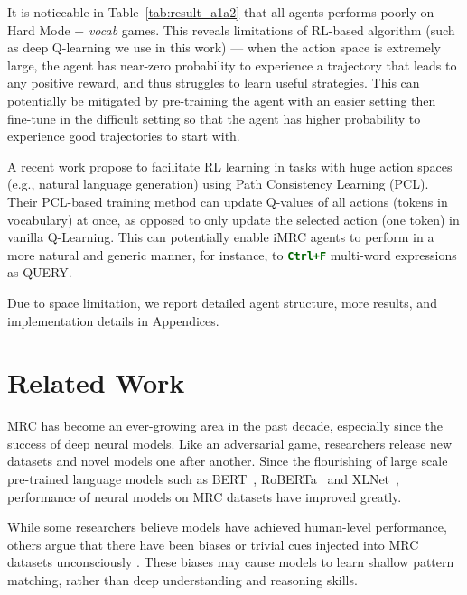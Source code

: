 \documentclass[11pt]{article}
\newcommand{\code}[1]{\texttt{#1}}
\newcommand{\cmd}[1]{\textcolor{darkgreen}{\textbf{\small{\code{#1}}}}}
\newcommand{\imrc}{iMRC\xspace}
\newcommand{\ctrlf}{Ctrl+F\xspace}
\newcommand{\query}{\textcolor{orange2}{\small{QUERY}}\xspace}
\begin{document}
It is noticeable in Table~\ref{tab:result_a1a2} that all agents performs poorly on Hard Mode + \textit{vocab} games.
This reveals limitations of RL-based algorithm (such as deep Q-learning we use in this work) --- when the action space is extremely large, the agent has near-zero probability to experience a trajectory that leads to any positive reward, and thus struggles to learn useful strategies.
This can potentially be mitigated by pre-training the agent with an easier setting then fine-tune in the difficult setting so that the agent has higher probability to experience good trajectories to start with.

A recent work \citep{guo2021text} propose to facilitate RL learning in tasks with huge action spaces (e.g., natural language generation) using Path Consistency Learning (PCL). 
Their PCL-based training method can update Q-values of all actions (tokens in vocabulary) at once, as opposed to only update the selected action (one token) in vanilla Q-Learning.
This can potentially enable \imrc agents to perform in a more natural and generic manner, for instance, to \cmd{\ctrlf} multi-word expressions as \query.

Due to space limitation, we report detailed agent structure, more results, and implementation details in Appendices.


\section{Related Work}
\label{section:related_work}

MRC has become an ever-growing area in the past decade, especially since the success of deep neural models.
Like an adversarial game, researchers release new datasets \citep{hill2015goldilocks,chen2016thorough,rajpurkar16squad,trischler16newsqa,nguyen16msmarco,reddy18coqa,yang18hotpot,choi18quac,tydiqa} and novel models \citep{trischler2016natural,wang16matchlstm,seo2016bidirectional,wang2017gated,huang2018fusionnet} one after another.
Since the flourishing of large scale pre-trained language models such as BERT~\citep{devlin2019bert}, RoBERTa~\citep{liu2019roberta} and XLNet~\citep{yang2019xlnet}, performance of neural models on MRC datasets have improved greatly.

While some researchers believe models have achieved human-level performance, others argue that there have been biases or trivial cues injected into MRC datasets unconsciously \citep{agrawal2016analyzing,weissenborn2017making,mudrakarta2018model,sugawara18easier,niven2019probing,sen2020what}.
These biases may cause models to learn shallow pattern matching, rather than deep understanding and reasoning skills.
\end{document}
